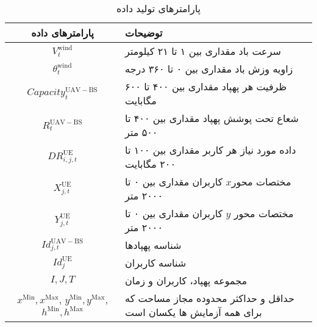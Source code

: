 \begin{table*}%
\centering
\caption{پارامترهای تولید داده}
\begin{tabular}{cp{12.5cm}}
\hline
پارامترهای داده & توضیحات \\ \hline
     $V_{t}^{\mathrm{wind}}$          &       سرعت باد مقداری بین ۱ تا ۲۱ کیلومتر        \\ 
     $\theta_{t}^{\mathrm{wind}}$     &        زاویه وزش باد مقداری بین ۰ تا ۳۶۰ درجه\\
     $Capacity_{t}^{\mathrm{UAV-BS}}$    &    ظرفیت هر پهپاد مقداری بین ۴۰۰ تا ۶۰۰ مگابایت\\
     $R_{t}^{\mathrm{UAV-BS}}$      &      شعاع تحت پوشش پهپاد مقداری بین ۴۰۰ تا ۵۰۰ متر\\
     $DR_{i,j,t}^{\mathrm{UE}}$       &      داده مورد نیاز هر کاربر مقداری بین ۱۰۰ تا ۲۰۰ مگابایت\\
     $X_{j,t}^{\mathrm{UE}}$          &      مختصات محور$x$ کاربران مقداری بین ۰ تا ۲۰۰۰ متر \\
     $Y_{j,t}^{\mathrm{UE}}$          &      مختصات محور $y$ کاربران مقداری بین ۰ تا ۲۰۰۰ متر\\
     $Id_{j,t}^{\mathrm{UAV-BS}}$        &      شناسه پهپاد‌ها\\
     $Id_{j}^{\mathrm{UE}}$           &      شناسه کاربران \\ 
     $I,J,T$                 &   مجموعه پهپاد، کاربران و زمان\\
     $x^{\mathrm{Min}},x^{\mathrm{Max}}$, $y^{\mathrm{Min}},y^{\mathrm{Max}}$, $h^{\mathrm{Min}},h^{\mathrm{Max}}$ &  حداقل و حداکثر محدوده مجاز مساحت که برای همه آزمایش ها یکسان است \\ \hline
\end{tabular}
\label{tab:gen}
\end{table*}